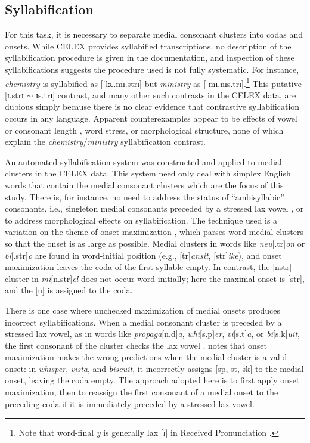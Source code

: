 \subsection{Syllabification}

For this task, it is necessary to separate medial consonant clusters into codas and onsets. While CELEX provides syllabified transcriptions, no description of the syllabification procedure is given in the documentation, and inspection of these syllabifications suggests the procedure used is not fully systematic. For instance, \emph{chemistry} is syllabified as [ˈkɛ.mɪ.strɪ] but \emph{ministry} as [ˈmɪ.nɪs.trɪ].\footnote{Note that word-final \emph{y} is generally lax [ɪ] in Received Pronunciation \citep[][294]{AOE2}.} This putative [ɪ.strɪ $\sim$ ɪs.trɪ] contrast, and many other such contrasts in the CELEX data, are dubious simply because there is no clear evidence that contrastive syllabification occurs in any language. Apparent counterexamples appear to be effects of vowel or consonant length \citep[e.g.,][]{Elfner2006}, word stress, or morphological structure, none of which explain the \emph{chemistry}/\emph{ministry} syllabification contrast.

An automated syllabification system was constructed and applied to medial clusters in the CELEX data. This system need only deal with simplex English words that contain the medial consonant clusters which are the focus of this study.  There is, for instance, no need to address the status of ``ambisyllabic'' consonants, i.e., singleton medial consonants preceded by a stressed lax vowel \citep[][219f.]{Rubach1996}, or to address morphological effects on syllabification. The technique used is a variation on the theme of onset maximization \citep[42f.]{Kahn1976}, which parses word-medial clusters so that the onset is as large as possible. Medial clusters in words like \emph{neu}[.tr]\emph{on} or \emph{bi}[.str]\emph{o} are found in word-initial position (e.g., [tr]\emph{ansit}, [str]\emph{ike}), and onset maximization leaves the coda of the first syllable empty. In contrast, the [nstr] cluster in \emph{mi}[n.str]\emph{el} does not occur word-initially; here the maximal onset is [str], and the [n] is assigned to the coda.

There is one case where unchecked maximization of medial onsets produces incorrect syllabifications. When a medial consonant cluster is preceded by a stressed lax vowel, as in words like \emph{propaga}[n.d]\emph{a}, \emph{whi}[s.p]\emph{er}, \emph{vi}[s.t]\emph{a}, or \emph{bi}[s.k]\emph{uit}, the first consonant of the cluster checks the lax vowel \citep[e.g.,][3]{Hammond1997}. \citet[][55]{Harris1994} notes that onset maximization makes the wrong predictions when the medial cluster is a valid onset: in \emph{whisper}, \emph{vista}, and \emph{biscuit}, it incorrectly assigns [sp, st, sk] to the medial onset, leaving the coda empty. The approach adopted here is to first apply onset maximization, then to reassign the first consonant of a medial onset to the preceding coda if it is immediately preceded by a stressed lax vowel.

